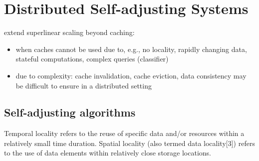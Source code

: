 \section{Distributed Self-adjusting Systems}
\label{sec:architecture}

extend superlinear scaling beyond caching:
\begin{itemize}
\item when caches cannot be used due to, e.g., no locality, rapidly changing data, stateful computations, complex queries (classifier)
\item   due to complexity: cache invalidation, cache eviction, data consistency may be difficult to ensure in a distributed setting 
\end{itemize}



\subsection{Self-adjusting algorithms}
\label{sec:sa-alg}

Temporal locality refers to the reuse of specific data and/or resources within a relatively small time duration. Spatial locality (also termed data locality[3]) refers to the use of data elements within relatively close storage locations.

